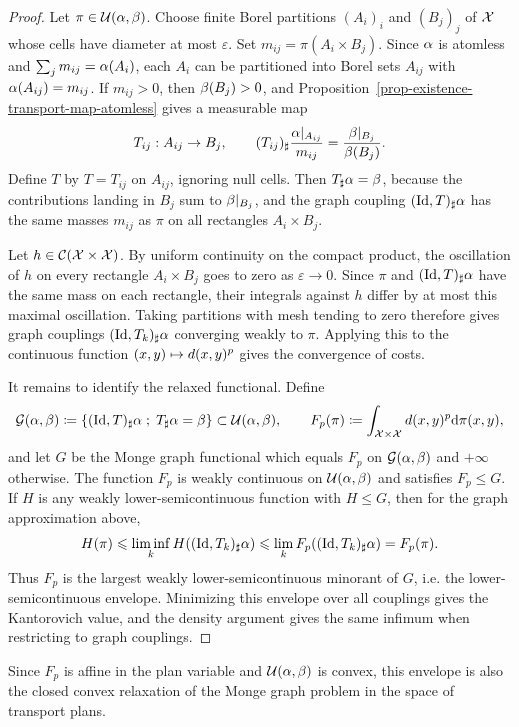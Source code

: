 \begin{proof}
	Let $\pi\in\mathcal{U}(\alpha,\beta)$. Choose finite Borel partitions $(A_i)_i$ and $(B_j)_j$ of $\mathcal{X}$ whose cells have diameter at most $\varepsilon$. Set $m_{ij}=\pi(A_i\times B_j)$. Since $\alpha$ is atomless and $\sum_j m_{ij}=\alpha(A_i)$, each $A_i$ can be partitioned into Borel sets $A_{ij}$ with $\alpha(A_{ij})=m_{ij}$. If $m_{ij}>0$, then $\beta(B_j)>0$, and Proposition~\ref{prop-existence-transport-map-atomless} gives a measurable map
	\[
		T_{ij}:A_{ij}\to B_j,
		\qquad
		(T_{ij})_\sharp\frac{\alpha|_{A_{ij}}}{m_{ij}}
		=
		\frac{\beta|_{B_j}}{\beta(B_j)}.
	\]
	Define $T$ by $T=T_{ij}$ on $A_{ij}$, ignoring null cells. Then $T_\sharp\alpha=\beta$, because the contributions landing in $B_j$ sum to $\beta|_{B_j}$, and the graph coupling $(\mathrm{Id},T)_\sharp\alpha$ has the same masses $m_{ij}$ as $\pi$ on all rectangles $A_i\times B_j$.

	Let $h\in\mathcal{C}(\mathcal{X}\times\mathcal{X})$. By uniform continuity on the compact product, the oscillation of $h$ on every rectangle $A_i\times B_j$ goes to zero as $\varepsilon\to0$. Since $\pi$ and $(\mathrm{Id},T)_\sharp\alpha$ have the same mass on each rectangle, their integrals against $h$ differ by at most this maximal oscillation. Taking partitions with mesh tending to zero therefore gives graph couplings $(\mathrm{Id},T_k)_\sharp\alpha$ converging weakly to $\pi$. Applying this to the continuous function $(x,y)\mapsto d(x,y)^p$ gives the convergence of costs.

	It remains to identify the relaxed functional. Define
	\[
		\mathcal G(\alpha,\beta)
		\coloneqq
		\left\{ (\mathrm{Id},T)_\sharp\alpha \;;\; T_\sharp\alpha=\beta \right\}
		\subset\mathcal{U}(\alpha,\beta),
		\qquad
		F_p(\pi)\coloneqq\int_{\mathcal{X}\times\mathcal{X}}d(x,y)^p\mathrm{d}\pi(x,y),
	\]
	and let $G$ be the Monge graph functional which equals $F_p$ on $\mathcal G(\alpha,\beta)$ and $+\infty$ otherwise. The function $F_p$ is weakly continuous on $\mathcal{U}(\alpha,\beta)$ and satisfies $F_p\leq G$. If $H$ is any weakly lower-semicontinuous function with $H\leq G$, then for the graph approximation above,
	\[
		H(\pi)\leqslant\liminf_k H((\mathrm{Id},T_k)_\sharp\alpha)
		\leqslant
		\lim_k F_p((\mathrm{Id},T_k)_\sharp\alpha)=F_p(\pi).
	\]
	Thus $F_p$ is the largest weakly lower-semicontinuous minorant of $G$, i.e. the lower-semicontinuous envelope. Minimizing this envelope over all couplings gives the Kantorovich value, and the density argument gives the same infimum when restricting to graph couplings.
\end{proof}

Since $F_p$ is affine in the plan variable and $\mathcal{U}(\alpha,\beta)$ is convex, this envelope is also the closed convex relaxation of the Monge graph problem in the space of transport plans.

